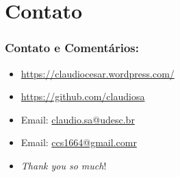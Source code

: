 \documentclass{beamer}
\begin{document}
\section*{Contato}

\begin{frame}
\frametitle{Contato e Comentários:}
  
\begin{block}{}
  \begin{itemize}
  \item \url{https://claudiocesar.wordpress.com/}
   \item \url{https://github.com/claudiosa}
   \item Email: \url{claudio.sa@udesc.br}
    \item Email: \url{ccs1664@gmail.comr}

  \item \textit{Thank you so much}!

  \end{itemize}
  \end{block}

\end{frame}


\end{document}
